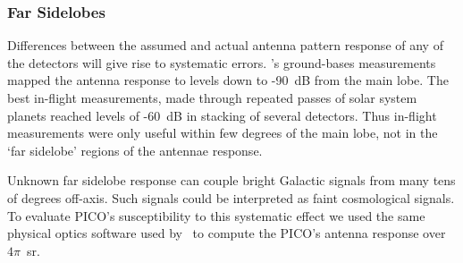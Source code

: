 \documentclass[PICOReport.tex]{subfiles}
\begin{document}


\subsubsection{Far Sidelobes}
\label{sec:fsl}

Differences between the assumed and actual antenna pattern response of any of the detectors will give rise to systematic errors. \planck 's ground-bases measurements mapped the antenna response to levels down to -90~dB from the main lobe. The best in-flight measurements, made through repeated passes of solar system planets reached levels of -60~dB in stacking of several detectors. Thus in-flight measurements were only useful  within few degrees of the main lobe, not in the `far sidelobe' regions of the antennae response.  

Unknown far sidelobe response can couple bright Galactic signals from many tens of degrees off-axis. Such signals could be interpreted as faint cosmological signals. To evaluate PICO's susceptibility to this systematic effect we used the same physical optics software used by \planck\ to compute the PICO's antenna response over $4\pi$~sr.  
\end{document}
